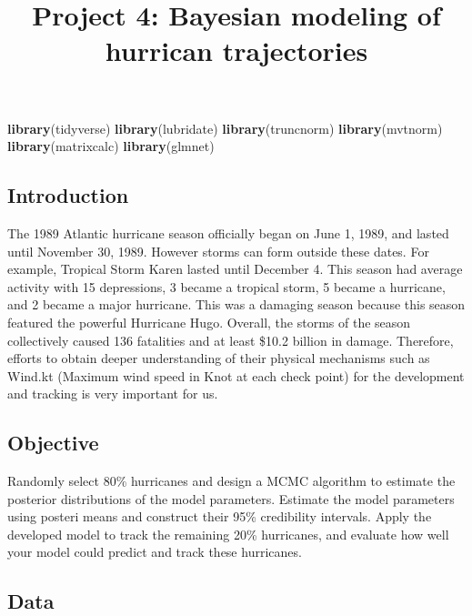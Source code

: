 \documentclass[]{article}
\title{Project 4: Bayesian modeling of hurrican trajectories}
\author{}
\date{}
\newenvironment{Shaded}{\begin{snugshade}}{\end{snugshade}}
\newcommand{\KeywordTok}[1]{\textcolor[rgb]{0.13,0.29,0.53}{\textbf{#1}}}
\newcommand{\NormalTok}[1]{#1}
\begin{document}
\maketitle

\begin{Shaded}
\begin{Highlighting}[]
\KeywordTok{library}\NormalTok{(tidyverse)}
\KeywordTok{library}\NormalTok{(lubridate)}
\KeywordTok{library}\NormalTok{(truncnorm)}
\KeywordTok{library}\NormalTok{(mvtnorm)}
\KeywordTok{library}\NormalTok{(matrixcalc)}
\KeywordTok{library}\NormalTok{(glmnet)}
\end{Highlighting}
\end{Shaded}

\hypertarget{introduction}{%
\subsection{Introduction}\label{introduction}}

The 1989 Atlantic hurricane season officially began on June 1, 1989, and
lasted until November 30, 1989. However storms can form outside these
dates. For example, Tropical Storm Karen lasted until December 4. This
season had average activity with 15 depressions, 3 became a tropical
storm, 5 became a hurricane, and 2 became a major hurricane. This was a
damaging season because this season featured the powerful Hurricane
Hugo. Overall, the storms of the season collectively caused 136
fatalities and at least \$10.2 billion in damage. Therefore, efforts to
obtain deeper understanding of their physical mechanisms such as Wind.kt
(Maximum wind speed in Knot at each check point) for the development and
tracking is very important for us.

\hypertarget{objective}{%
\subsection{Objective}\label{objective}}

Randomly select 80\% hurricanes and design a MCMC algorithm to estimate
the posterior distributions of the model parameters. Estimate the model
parameters using posteri means and construct their 95\% credibility
intervals. Apply the developed model to track the remaining 20\%
hurricanes, and evaluate how well your model could predict and track
these hurricanes.

\hypertarget{data}{%
\subsection{Data}\label{data}}
\end{document}

